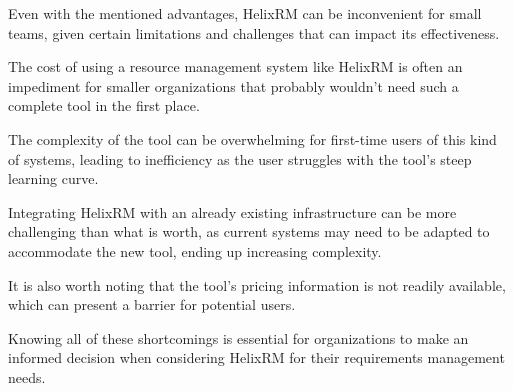
Even with the mentioned advantages, HelixRM can be inconvenient for small teams, given certain
limitations and challenges that can impact its effectiveness.

The cost of using a resource management system like HelixRM
is often an impediment for smaller organizations that probably wouldn't need
such a complete tool in the first place\cite{lydia_y__chen_2019}.

The complexity of the tool can be overwhelming for first-time users of this kind of systems,
leading to inefficiency as the user struggles with the tool's steep learning curve\cite{the_submission_infrastructure}.

Integrating HelixRM with an already existing infrastructure can be more challenging
than what is worth, as current systems may need to be adapted to accommodate the new tool,
ending up increasing complexity\cite{christian_glaschke__2015}.

It is also worth noting that the tool's pricing information is not readily available,
which can present a barrier for potential users\footnotemark[2].

Knowing all of these shortcomings is essential for organizations to make an informed decision
when considering HelixRM for their requirements management needs.
